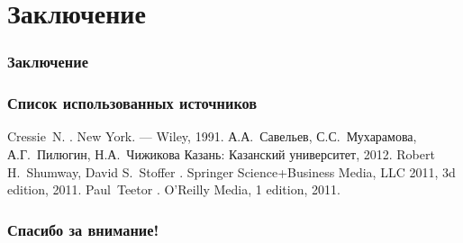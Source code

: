 \documentclass{beamer}
\begin{document}
\section{Заключение}
\begin{frame}
  \frametitle{Заключение}

\end{frame}

\begin{frame}
  \frametitle{Список использованных источников}
  \begin{scriptsize}
  \begin{thebibliography}{5}
    \beamertemplatebookbibitems
      Cressie~N.
      .
      \newblock New York. --- Wiley, 1991.
    \beamertemplatebookbibitems
      А.А.~Савельев, С.С.~Мухарамова, А.Г.~Пилюгин, Н.А.~Чижикова
      \newblock Казань: Казанский университет, 2012.
    \beamertemplatebookbibitems
      Robert H.~Shumway, David S.~Stoffer
      .
      \newblock Springer Science+Business Media, LLC 2011, 3d edition, 2011.
    \beamertemplatebookbibitems
      Paul~Teetor
      .
      \newblock O’Reilly Media, 1 edition, 2011.
  \end{thebibliography}
\end{scriptsize}
\end{frame}

%
%

\begin{frame}[c]
\begin{center}
\frametitle{\LARGE Спасибо за внимание!}

{\LARGE \inserttitle}

\bigskip

{\insertauthor} 

\bigskip\bigskip

{\insertinstitute}

\bigskip\bigskip

{\large \insertdate}
\end{center}
\end{frame}
\end{document}
